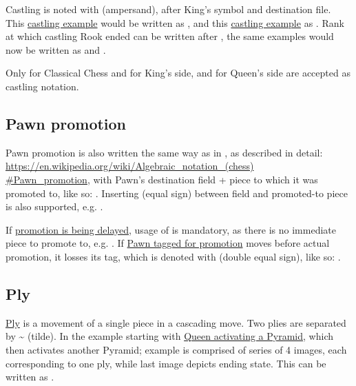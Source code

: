 Castling is noted with \alg{\&} (ampersand), after King's symbol and destination file. This
\hyperref[fig:age_of_aquarius_castling_left_04]{castling example} would be written as ,
and this \hyperref[fig:one_castling_right_04]{castling example} as . Rank at which
castling Rook ended can be written after \alg{\&}, the same examples would now be written as
 and .

Only for Classical Chess  and  for King's side,  and
 for Queen's side are accepted as castling notation.

\subsection*{Pawn promotion}
\label{sec:Appendix/Pawn promotion}

Pawn promotion is also written the same way as in , as described in detail: \\
\href{https://en.wikipedia.org/wiki/Algebraic\_notation\_(chess)\#Pawn\_promotion}{https://en.wikipedia.org/wiki/Algebraic\_notation\_(chess)\\
\#Pawn\_promotion}, with Pawn's destination field + piece to which it was promoted to,
like so: . Inserting \alg{=} (equal sign) between field and promoted-to piece
is also supported, e.g. .

If \hyperref[fig:scn_aoa_05_delayed_promo_pawn_2_moved]{promotion is being delayed}, usage of
\alg{=} is mandatory, as there is no immediate piece to promote to, e.g. .
If \hyperref[fig:scn_aoa_04_delayed_promo_pawn_2_tagged]{Pawn tagged for promotion} moves
before actual promotion, it losses its tag, which is denoted with \alg{==} (double equal
sign), like so: .

\subsection*{Ply}
\label{sec:Appendix/Ply}

\hyperref[sec:Terms/Ply]{Ply} is a movement of a single piece in a cascading move. Two plies
are separated by \~{} (tilde). In the example starting with
\hyperref[fig:scn_ma_11_cascading_init]{Queen activating a Pyramid}, which then activates another
Pyramid; example is comprised of series of 4 images, each corresponding to one ply, while last
image depicts ending state. This can be written as .

